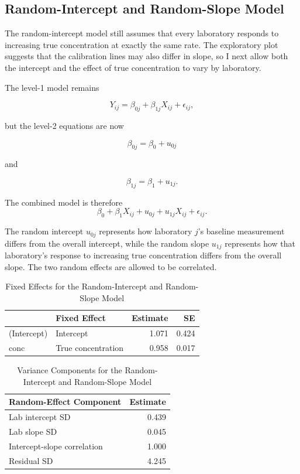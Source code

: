 \documentclass[
]{article}
\begin{document}
\subsection{Random-Intercept and Random-Slope
Model}\label{random-intercept-and-random-slope-model}

The random-intercept model still assumes that every laboratory responds
to increasing true concentration at exactly the same rate. The
exploratory plot suggests that the calibration lines may also differ in
slope, so I next allow both the intercept and the effect of true
concentration to vary by laboratory.

The level-1 model remains

\[
Y_{ij} = \beta_{0j} + \beta_{1j}X_{ij} + \epsilon_{ij},
\]

but the level-2 equations are now

\[
\beta_{0j} = \beta_0 + u_{0j}
\]

and

\[
\beta_{1j} = \beta_1 + u_{1j}.
\]

The combined model is therefore \[
\beta_0 + \beta_1X_{ij} + u_{0j} + u_{1j}X_{ij} + \epsilon_{ij}.
\]

The random intercept \(u_{0j}\) represents how laboratory \(j\)'s
baseline measurement differs from the overall intercept, while the
random slope \(u_{1j}\) represents how that laboratory's response to
increasing true concentration differs from the overall slope. The two
random effects are allowed to be correlated.

\begin{table}[!h]
\centering
\caption{\label{tab:random intercept and slope}Fixed Effects for the Random-Intercept and Random-Slope Model}
\centering
\begin{tabular}[t]{llrr}
\toprule
  & Fixed Effect & Estimate & SE\\
\midrule
(Intercept) & Intercept & 1.071 & 0.424\\
conc & True concentration & 0.958 & 0.017\\
\bottomrule
\end{tabular}
\end{table}

\begin{table}[!h]
\centering
\caption{\label{tab:random intercept and slope}Variance Components for the Random-Intercept and Random-Slope Model}
\centering
\begin{tabular}[t]{lr}
\toprule
Random-Effect Component & Estimate\\
\midrule
Lab intercept SD & 0.439\\
Lab slope SD & 0.045\\
Intercept-slope correlation & 1.000\\
Residual SD & 4.245\\
\bottomrule
\end{tabular}
\end{table}
\end{document}
